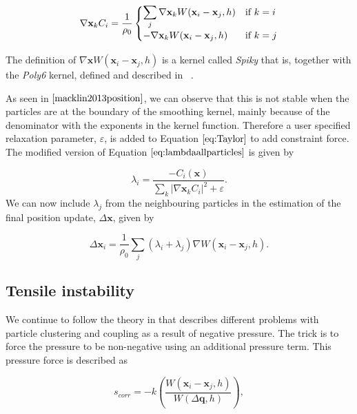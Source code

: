 \begin{equation}
 \nabla \mathbf{x}_k C_i = \frac{1}{\rho_0}
  \begin{cases}
  \label{eq:NablaC}
   \displaystyle \sum\limits_{j} \nabla \mathbf{x}_k W(\mathbf{x}_i - \mathbf{x}_j, h) & $\text{if }$ k = i \\
   - \nabla \mathbf{x}_k W(\mathbf{x}_i - \mathbf{x}_j, h) & $\text{if }$ k = j \\
  \end{cases}
\end{equation}

The definition of $ \nabla \mathbf{x} W(\mathbf{x}_i - \mathbf{x}_j, h) $ is a
kernel called \textit{Spiky} that is, together with the \textit{Poly6}
kernel, defined and described in ~\cite{muller2003particle}.

As seen in $\cite{macklin2013position}$, we can observe that this is not stable
when the particles are at the boundary of the smoothing kernel, mainly because
of the denominator with the exponents in the kernel function.  Therefore a user
specified relaxation parameter, $\varepsilon$, is added to Equation $\ref{eq:Taylor}$ to add constraint force. The modified version of Equation $\ref{eq:lambdaallparticles}$ is given by

\begin{equation}
\label{eq:LambdaEpsilon}
\lambda_i = \frac{- C_i(\mathbf{x}) }{ \sum\limits_{k} |\nabla \mathbf{x}_k C_i|^2 + \varepsilon}.
\end{equation}
We can now include $\lambda_j$ from the neighbouring particles in the
estimation of the final position update, $\Delta \mathbf{x}$, given by

\begin{equation}
\label{eq:DeltaP}
\Delta \mathbf{x}_i = \frac{1}{\rho_0} \sum\limits_{j} (\lambda_i + \lambda_j) \nabla W(\mathbf{x}_i - \mathbf{x}_j, h).
\end{equation}

\subsection{Tensile instability} We continue to follow the theory in
\cite{macklin2013position} that describes different problems with particle clustering and coupling as a result of negative pressure. The trick is to force the pressure to be non-negative using an additional pressure term. This pressure
force is described as

\begin{equation}
\label{eq:Scorr}
s_{corr} = -k \left( \frac{W(\mathbf{x}_i - \mathbf{x}_j, h)}{W(\Delta \mathbf{q}, h)} \right),
\end{equation}

